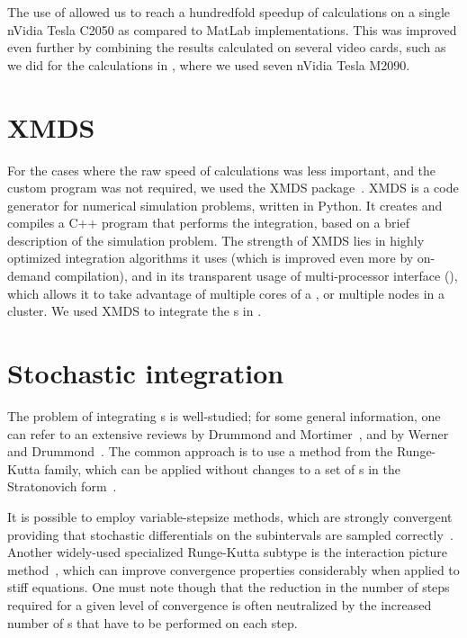 The use of  allowed us to reach a hundredfold speedup of calculations on a single nVidia Tesla C2050 as compared to MatLab implementations.
This was improved even further by combining the results calculated on several video cards, such as we did for the calculations in , where we used seven nVidia Tesla M2090.


\section{XMDS}

For the cases where the raw speed of calculations was less important, and the custom  program was not required, we used the XMDS package~\cite{Collecutt2001,Dennis2013}.
XMDS is a code generator for numerical simulation problems, written in Python.
It creates and compiles a C++ program that performs the integration, based on a brief  description of the simulation problem.
The strength of XMDS lies in highly optimized integration algorithms it uses (which is improved even more by on-demand compilation), and in its transparent usage of multi-processor interface (), which allows it to take advantage of multiple cores of a , or multiple nodes in a cluster.
We used XMDS to integrate the s in .


\section{Stochastic integration}

The problem of integrating s is well-studied; for some general information, one can refer to an extensive reviews by Drummond and Mortimer~\cite{Drummond1990}, and by Werner and Drummond~\cite{Werner1997}.
The common approach is to use a method from the Runge-Kutta family, which can be applied without changes to a set of s in the Stratonovich form~\cite{Wilkie2004,Wilkie2005}.

It is possible to employ variable-stepsize methods, which are strongly convergent providing that stochastic differentials on the subintervals are sampled correctly~\cite{Wilkie2005}.
Another widely-used specialized Runge-Kutta subtype is the  interaction picture method~\cite{CaradocDavies2000}, which can improve convergence properties considerably when applied to stiff equations.
One must note though that the reduction in the number of steps required for a given level of convergence is often neutralized by the increased number of s that have to be performed on each step.

